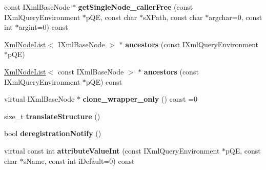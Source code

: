 \begin{DoxyCompactItemize}
\item 
\hypertarget{classgeneral__server_1_1XmlBaseNode_ad4e0ee34e5bc120ec473b2ebc0542d11}{const \-I\-Xml\-Base\-Node $\ast$ {\bfseries get\-Single\-Node\-\_\-caller\-Free} (const \-I\-Xml\-Query\-Environment $\ast$p\-Q\-E, const char $\ast$s\-X\-Path, const char $\ast$argchar=0, const int $\ast$argint=0) const }\label{classgeneral__server_1_1XmlBaseNode_ad4e0ee34e5bc120ec473b2ebc0542d11}

\item 
\hypertarget{classgeneral__server_1_1XmlBaseNode_a66976707a93b7de0a76349393b21d862}{\hyperlink{classgeneral__server_1_1XmlNodeList}{\-Xml\-Node\-List}$<$ \-I\-Xml\-Base\-Node $>$ $\ast$ {\bfseries ancestors} (const \-I\-Xml\-Query\-Environment $\ast$p\-Q\-E)}\label{classgeneral__server_1_1XmlBaseNode_a66976707a93b7de0a76349393b21d862}

\item 
\hypertarget{classgeneral__server_1_1XmlBaseNode_af6543101d35be54534a6d537618d105b}{\hyperlink{classgeneral__server_1_1XmlNodeList}{\-Xml\-Node\-List}$<$ const \-I\-Xml\-Base\-Node $>$ $\ast$ {\bfseries ancestors} (const \-I\-Xml\-Query\-Environment $\ast$p\-Q\-E) const }\label{classgeneral__server_1_1XmlBaseNode_af6543101d35be54534a6d537618d105b}

\item 
\hypertarget{classgeneral__server_1_1XmlBaseNode_a3583da6b427eaa7131c0f5aeb705dc4a}{virtual \-I\-Xml\-Base\-Node $\ast$ {\bfseries clone\-\_\-wrapper\-\_\-only} () const =0}\label{classgeneral__server_1_1XmlBaseNode_a3583da6b427eaa7131c0f5aeb705dc4a}

\item 
\hypertarget{classgeneral__server_1_1XmlBaseNode_a9ff0a60c22dfa069b87fa075067f281f}{size\-\_\-t {\bfseries translate\-Structure} ()}\label{classgeneral__server_1_1XmlBaseNode_a9ff0a60c22dfa069b87fa075067f281f}

\item 
\hypertarget{classgeneral__server_1_1XmlBaseNode_a1ebbf01dec91a6380cc47d33a63d8dff}{bool {\bfseries deregistration\-Notify} ()}\label{classgeneral__server_1_1XmlBaseNode_a1ebbf01dec91a6380cc47d33a63d8dff}

\item 
\hypertarget{classgeneral__server_1_1XmlBaseNode_acd4ba23c15d181d01384199a97115a7e}{virtual const int {\bfseries attribute\-Value\-Int} (const \-I\-Xml\-Query\-Environment $\ast$p\-Q\-E, const char $\ast$s\-Name, const int i\-Default=0) const }\label{classgeneral__server_1_1XmlBaseNode_acd4ba23c15d181d01384199a97115a7e}


\end{DoxyCompactItemize}
